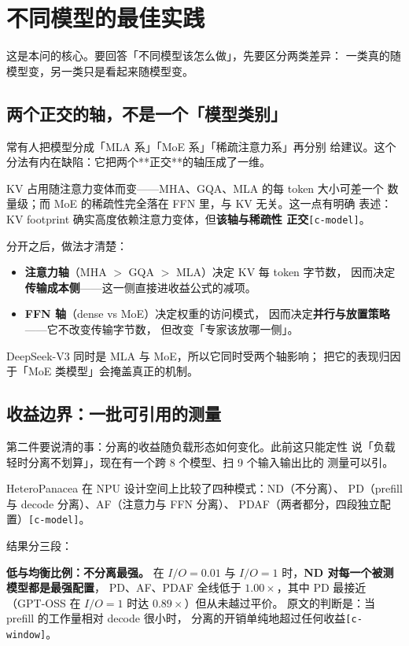 \section{不同模型的最佳实践}
\label{sec:model}

这是本问的核心。要回答「不同模型该怎么做」，先要区分两类差异：
一类真的随模型变，另一类只是看起来随模型变。

\subsection{两个正交的轴，不是一个「模型类别」}

\noindent 常有人把模型分成「MLA 系」「MoE 系」「稀疏注意力系」再分别
给建议。这个分法有内在缺陷：它把两个**正交**的轴压成了一维。

KV 占用随注意力变体而变——MHA、GQA、MLA 的每 token 大小可差一个
数量级；而 MoE 的稀疏性完全落在 FFN 里，与 KV 无关。这一点有明确
表述：KV footprint 确实高度依赖注意力变体，但\textbf{该轴与稀疏性
正交}\texttt{[c-model]}。

分开之后，做法才清楚：

\begin{itemize}
\item \textbf{注意力轴}（MHA $>$ GQA $>$ MLA）决定 KV 每 token 字节数，
  因而决定\textbf{传输成本侧}——这一侧直接进收益公式的减项。
\item \textbf{FFN 轴}（dense vs MoE）决定权重的访问模式，
  因而决定\textbf{并行与放置策略}——它不改变传输字节数，
  但改变「专家该放哪一侧」。
\end{itemize}

DeepSeek-V3 同时是 MLA 与 MoE，所以它同时受两个轴影响；
把它的表现归因于「MoE 类模型」会掩盖真正的机制。

\subsection{收益边界：一批可引用的测量}

第二件要说清的事：分离的收益随负载形态如何变化。此前这只能定性
说「负载轻时分离不划算」，现在有一个跨 8 个模型、扫 9 个输入输出比的
测量可以引。

HeteroPanacea 在 NPU 设计空间上比较了四种模式：ND（不分离）、
PD（prefill 与 decode 分离）、AF（注意力与 FFN 分离）、
PDAF（两者都分，四段独立配置）\texttt{[c-model]}。

结果分三段：

\noindent\textbf{低与均衡比例：不分离最强。} 在 $I/O = 0.01$ 与
$I/O = 1$ 时，\textbf{ND 对每一个被测模型都是最强配置}，
PD、AF、PDAF 全线低于 $1.00\times$，其中 PD 最接近
（GPT-OSS 在 $I/O=1$ 时达 $0.89\times$）但从未越过平价。
原文的判断是：当 prefill 的工作量相对 decode 很小时，
分离的开销单纯地超过任何收益\texttt{[c-window]}。

